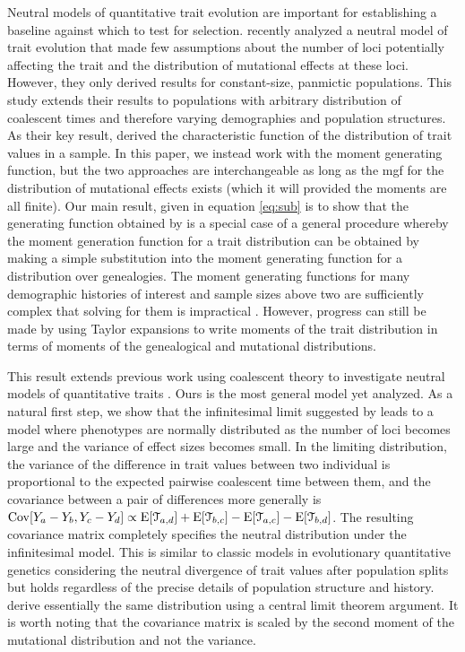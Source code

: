 Neutral models of quantitative trait evolution are important for establishing a
baseline against which to test for selection. \citet{Schraiber2015} recently
analyzed a neutral model of trait evolution that made few assumptions about the
number of loci potentially affecting the trait and the distribution of
mutational effects at these loci. However, they only derived results for
constant-size, panmictic populations. This study extends their results to
populations with arbitrary distribution of coalescent times and therefore
varying demographies and population structures. As their key result,
\citet{Schraiber2015} derived the characteristic function of the distribution of
trait values in a sample. In this paper, we instead work with the moment
generating function, but the two approaches are interchangeable as long as the
mgf for the distribution of mutational effects exists (which it will provided
the moments are all finite). Our main result, given in equation \eqref{eq:sub}
is to show that the generating function obtained by \citet{Schraiber2015} is a
special case of a general procedure whereby the moment generation function for a
trait distribution can be obtained by making a simple substitution into the
moment generating function for a distribution over genealogies. The moment
generating functions for many demographic histories of interest and sample sizes
above two are sufficiently complex that solving for them is impractical
\citep{Lohse2011}. However, progress can still be made by using Taylor
expansions to write moments of the trait distribution in terms of moments of the
genealogical and mutational distributions.

This result extends previous work using coalescent theory to investigate neutral
models of quantitative traits \citep{Whitlock1999,Schraiber2015}. Ours is the
most general model yet analyzed. As a natural first step, we show that the
infinitesimal limit suggested by \citet{Fisher1918} leads to a model where
phenotypes are normally distributed as the number of loci becomes large and the
variance of effect sizes becomes small. In the limiting distribution, the
variance of the difference in trait values between two individual is
proportional to the expected pairwise coalescent time between them, and the
covariance between a pair of differences more generally is $\mathrm{Cov}[Y_a - Y_b,Y_c -
Y_d] \propto \mathrm{E}[\mathcal{T}_{a,d}] + \mathrm{E}[\mathcal{T}_{b,c}] -
\mathrm{E}[\mathcal{T}_{a,c}] - \mathrm{E}[\mathcal{T}_{b,d}]$. The resulting covariance matrix
completely specifies the neutral distribution under the infinitesimal model.
This is similar to classic models in evolutionary quantitative genetics
considering the neutral divergence of trait values after population splits
\citep{Lande1976,Lynch1989} but holds regardless of the precise details of
population structure and history. \citet{Schraiber2015} derive essentially the
same distribution using a central limit theorem argument. It is worth noting
that the covariance matrix is scaled by the second moment of the mutational
distribution and not the variance.

